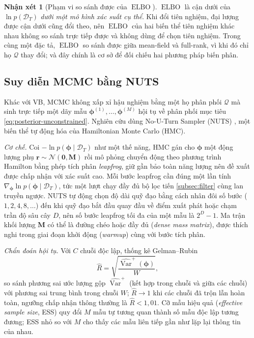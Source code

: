 \documentclass[12pt,a4paper]{article}
\numberwithin{equation}{section}
\theoremstyle{definition}
\newtheorem{remark}{Nhận xét}[section]
\newcommand{\Var}{\operatorname{Var}}
\newcommand{\ELBO}{\operatorname{ELBO}}
\newcommand{\Data}{\mathcal{D}}
\newcommand{\vecphi}{\symbf{\phi}}
\begin{document}
	\begin{remark}[Phạm vi so sánh được của $\ELBO$]\label{rem:elbo-scope}
		$\ELBO$ là cận dưới của $\ln p(\Data_T)$ \emph{dưới một mô hình xác suất cụ thể}. Khi đổi
		tiên nghiệm, đại lượng được cận dưới cũng đổi theo, nên $\ELBO$ của hai biến thể tiên
		nghiệm khác nhau không so sánh trực tiếp được và không dùng để chọn tiên nghiệm. Trong
		cùng một đặc tả, $\ELBO$ so sánh được giữa mean-field và full-rank, vì khi đó chỉ họ
		$\mathcal{Q}$ thay đổi; và đây chính là cơ sở để đối chiếu hai phương pháp biến phân.
	\end{remark}
	
	\subsection{Suy diễn MCMC bằng NUTS}\label{subsec:mcmc-nuts}
	Khác với VB, MCMC không xấp xỉ hậu nghiệm bằng một họ phân phối $\mathcal{Q}$ mà sinh trực
	tiếp một dãy mẫu $\vecphi^{(1)},\dots,\vecphi^{(M)}$ hội tụ về phân phối mục tiêu
	\eqref{eq:posterior-unconstrained}. Nghiên cứu dùng No-U-Turn Sampler (NUTS)
	\cite{hoffman2014}, một biến thể tự động hóa của Hamiltonian Monte Carlo (HMC).

	\emph{Cơ chế.} Coi $-\ln p(\vecphi\mid\Data_T)$ như một thế năng, HMC gán cho $\vecphi$ một
	động lượng phụ $\symbf r\sim\mathcal N(\symbf 0,\symbf M)$ rồi mô phỏng chuyển động theo
	phương trình Hamilton bằng phép tích phân \emph{leapfrog}, giữ gần bảo toàn năng lượng nên
	đề xuất được chấp nhận với xác suất cao. Mỗi bước leapfrog cần đúng một lần tính
	$\nabla_{\vecphi}\ln p(\vecphi\mid\Data_T)$, tức một lượt chạy đầy đủ bộ lọc tiến
	\cref{subsec:filter} cùng lan truyền ngược. NUTS tự động chọn độ dài quỹ đạo bằng cách nhân
	đôi số bước ($1,2,4,8,\dots$) đến khi quỹ đạo bắt đầu quay đầu về điểm xuất phát hoặc chạm
	trần độ sâu cây $D$, nên số bước leapfrog tối đa của một mẫu là $2^{D}-1$. Ma trận khối
	lượng $\symbf M$ có thể là đường chéo hoặc đầy đủ (\emph{dense mass matrix}), được thích
	nghi trong giai đoạn khởi động (\emph{warmup}) cùng với bước tích phân.

	\emph{Chẩn đoán hội tụ.} Với $C$ chuỗi độc lập, thống kê Gelman--Rubin
	\begin{equation}
		\widehat R=\sqrt{\frac{\widehat{\Var}^{+}(\vecphi)}{W}},
		\label{eq:rhat}
	\end{equation}
	so sánh phương sai ước lượng gộp $\widehat{\Var}^{+}$ (kết hợp trong chuỗi và giữa các
	chuỗi) với phương sai trung bình trong chuỗi $W$; $\widehat R\to 1$ khi các chuỗi đã trộn
	lẫn hoàn toàn, ngưỡng chấp nhận thông thường là $\widehat R<1{,}01$. Cỡ mẫu hiệu quả
	(\emph{effective sample size}, ESS) quy đổi $M$ mẫu tự tương quan thành số mẫu độc lập
	tương đương; ESS nhỏ so với $M$ cho thấy các mẫu liên tiếp gần như lặp lại thông tin của
	nhau.
\end{document}
